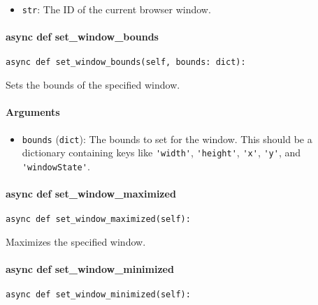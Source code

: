 \documentclass{article}
\begin{document}
\begin{itemize}
    \item \lstinline[style=pythonstyle]|str|: The ID of the current browser window.
\end{itemize}

\paragraph{async def set\_window\_bounds}

\begin{lstlisting}[style=pythonstyle]
async def set_window_bounds(self, bounds: dict):
\end{lstlisting}

\noindent Sets the bounds of the specified window.

\paragraph{Arguments}

\begin{itemize}
    \item \lstinline[style=pythonstyle]|bounds| (\lstinline[style=pythonstyle]|dict|): The bounds to set for the window. This should be a dictionary containing keys like \lstinline[style=pythonstyle]|'width'|, \lstinline[style=pythonstyle]|'height'|, \lstinline[style=pythonstyle]|'x'|, \lstinline[style=pythonstyle]|'y'|, and \lstinline[style=pythonstyle]|'windowState'|.
\end{itemize}

\paragraph{async def set\_window\_maximized}

\begin{lstlisting}[style=pythonstyle]
async def set_window_maximized(self):
\end{lstlisting}

\noindent Maximizes the specified window.

\paragraph{async def set\_window\_minimized}

\begin{lstlisting}[style=pythonstyle]
async def set_window_minimized(self):
\end{lstlisting}
\end{document}
